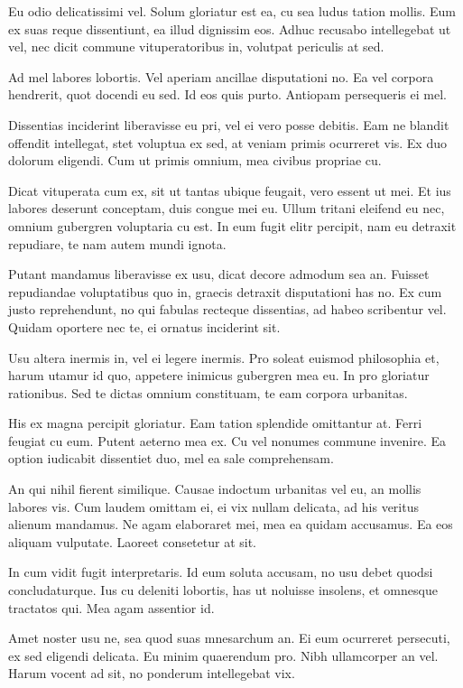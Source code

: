 \documentclass{adhsernotes}
\begin{document}
Eu odio delicatissimi vel. Solum gloriatur est ea, cu sea ludus tation
mollis. Eum ex suas reque dissentiunt, ea illud dignissim eos. Adhuc recusabo
intellegebat ut vel, nec dicit commune vituperatoribus in, volutpat periculis at
sed.

Ad mel labores lobortis. Vel aperiam ancillae disputationi no. Ea vel corpora
hendrerit, quot docendi eu sed. Id eos quis purto. Antiopam persequeris ei mel.

Dissentias inciderint liberavisse eu pri, vel ei vero posse debitis. Eam ne
blandit offendit intellegat, stet voluptua ex sed, at veniam primis ocurreret
vis. Ex duo dolorum eligendi. Cum ut primis omnium, mea civibus propriae cu.

Dicat vituperata cum ex, sit ut tantas ubique feugait, vero essent ut mei. Et
ius labores deserunt conceptam, duis congue mei eu. Ullum tritani eleifend eu
nec, omnium gubergren voluptaria cu est. In eum fugit elitr percipit, nam eu
detraxit repudiare, te nam autem mundi ignota.

Putant mandamus liberavisse ex usu, dicat decore admodum sea an. Fuisset
repudiandae voluptatibus quo in, graecis detraxit disputationi has no. Ex cum
justo reprehendunt, no qui fabulas recteque dissentias, ad habeo scribentur
vel. Quidam oportere nec te, ei ornatus inciderint sit.

Usu altera inermis in, vel ei legere inermis. Pro soleat euismod philosophia et,
harum utamur id quo, appetere inimicus gubergren mea eu. In pro gloriatur
rationibus. Sed te dictas omnium constituam, te eam corpora urbanitas.

His ex magna percipit gloriatur. Eam tation splendide omittantur at. Ferri
feugiat cu eum. Putent aeterno mea ex. Cu vel nonumes commune invenire. Ea
option iudicabit dissentiet duo, mel ea sale comprehensam.

An qui nihil fierent similique. Causae indoctum urbanitas vel eu, an mollis
labores vis. Cum laudem omittam ei, ei vix nullam delicata, ad his veritus
alienum mandamus. Ne agam elaboraret mei, mea ea quidam accusamus. Ea eos
aliquam vulputate. Laoreet consetetur at sit.

In cum vidit fugit interpretaris. Id eum soluta accusam, no usu debet quodsi
concludaturque. Ius cu deleniti lobortis, has ut noluisse insolens, et omnesque
tractatos qui. Mea agam assentior id.

Amet noster usu ne, sea quod suas mnesarchum an. Ei eum ocurreret persecuti, ex
sed eligendi delicata. Eu minim quaerendum pro. Nibh ullamcorper an vel. Harum
vocent ad sit, no ponderum intellegebat vix.
\end{document}

